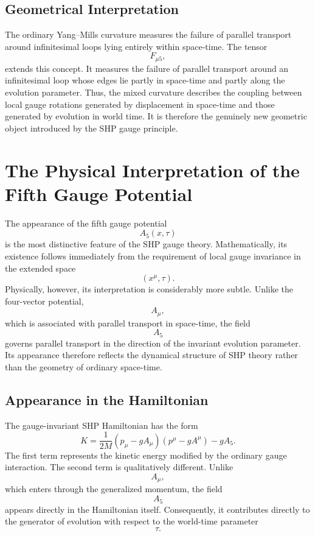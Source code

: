 \subsection{Geometrical Interpretation}
The ordinary Yang--Mills curvature measures the failure of parallel
transport around infinitesimal loops lying entirely within space-time.
The tensor
\[F_{\mu5},\]
extends this concept.
It measures the failure of parallel transport around an infinitesimal
loop whose edges lie partly in space-time and partly along the evolution
parameter.
Thus,
the mixed curvature describes the coupling between local gauge rotations
generated by displacement in space-time and those generated by evolution
in world time.
It is therefore the genuinely new geometric object introduced by the SHP
gauge principle.
\section{The Physical Interpretation of the Fifth Gauge Potential}
The appearance of the fifth gauge potential
\[A_5(x,\tau)\]
is the most distinctive feature of the SHP gauge theory.
Mathematically, its existence follows immediately from the requirement
of local gauge invariance in the extended space
\[(x^\mu,\tau).\]
Physically, however, its interpretation is considerably more subtle.
Unlike the four-vector potential,
\[A_\mu,\]
which is associated with parallel transport in space-time,
the field
\[A_5\]
governs parallel transport in the direction of the invariant evolution
parameter.
Its appearance therefore reflects the dynamical structure of SHP theory
rather than the geometry of ordinary space-time.
\subsection{Appearance in the Hamiltonian}
The gauge-invariant SHP Hamiltonian has the form
\[\boxed{K=\frac{1}{2M}(p_\mu-gA_\mu)(p^\mu-gA^\mu)-gA_5.}\]
The first term represents the kinetic energy modified by the ordinary
gauge interaction.
The second term is qualitatively different.
Unlike
\[A_\mu,\]
which enters through the generalized momentum,
the field
\[A_5\]
appears directly in the Hamiltonian itself.
Consequently,
it contributes directly to the generator of evolution with respect to the
world-time parameter
\[\tau.\]
